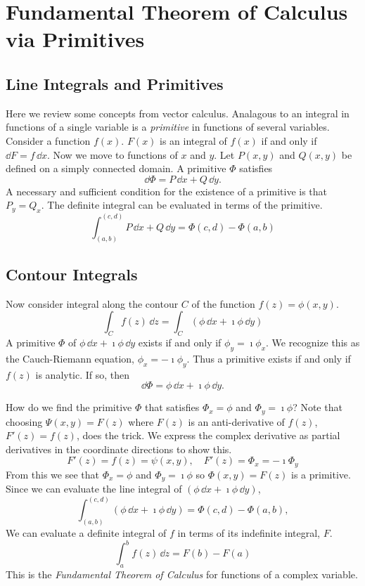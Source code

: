\section{Fundamental Theorem of Calculus via Primitives}



\subsection{Line Integrals and Primitives}


Here we review some concepts from vector calculus.  Analagous to an
integral in functions of a single variable is a \textit{primitive} in
functions of several variables.  Consider a function $f(x)$.  $F(x)$
is an integral of $f(x)$ if and only if $\dd F = f\,\dd x$.  Now we
move to functions of $x$ and $y$.  Let $P(x,y)$ and $Q(x,y)$ be
defined on a simply connected domain.  A primitive $\Phi$ satisfies
\[
\dd \Phi = P \,\dd x + Q \,\dd y.
\]
A necessary and sufficient condition for the existence of a primitive
is that $P_y = Q_x$.  
The definite integral can be evaluated in terms of the primitive.
\[
\int_{(a,b)}^{(c,d)} P \,\dd x + Q \,\dd y = \Phi(c,d) - \Phi(a,b)
\]



\subsection{Contour Integrals}


Now consider integral along the contour $C$ of the function 
$f(z) = \phi(x,y)$.  
\[
\int_C f(z)\,\dd z = \int_C (\phi\,\dd x + \imath \phi\,\dd y)
\]
A primitive $\Phi$ of $\phi\,\dd x + \imath \phi\,\dd y$ exists if and only if
$\phi_y = \imath \phi_x$.  We recognize this as the Cauch-Riemann equation, $\phi_x = - \imath \phi_y$.
Thus a primitive exists if and only if $f(z)$ is analytic.  If so, then
\[
\dd \Phi = \phi\,\dd x + \imath \phi\,\dd y.
\]

How do we find the primitive $\Phi$ that satisfies
$\Phi_x = \phi$ and $\Phi_y = \imath \phi$?  Note that choosing $\Psi(x,y) = F(z)$
where $F(z)$ is an anti-derivative of $f(z)$, $F'(z) = f(z)$, does the trick.
We express the complex derivative as partial derivatives in the coordinate 
directions to show this.
\[
F'(z) = f(z) = \psi(x,y), \quad F'(z) = \Phi_x = - \imath \Phi_y
\]
From this we see that $\Phi_x = \phi$ and $\Phi_y = \imath \phi$ so $\Phi(x,y) = F(z)$ 
is a primitive.
Since we can evaluate the line integral of $(\phi\,\dd x + \imath \phi\,\dd y)$,
\[
\int_{(a,b)}^{(c,d)} (\phi\,\dd x + \imath \phi\,\dd y) = \Phi(c,d) - \Phi(a,b),
\]
We can evaluate a definite integral of $f$ in terms of its indefinite 
integral, $F$.
\[
\int_a^b f(z) \,\dd z = F(b) - F(a)
\]
This is the \textit{Fundamental Theorem of Calculus} 
for functions of a complex variable.








